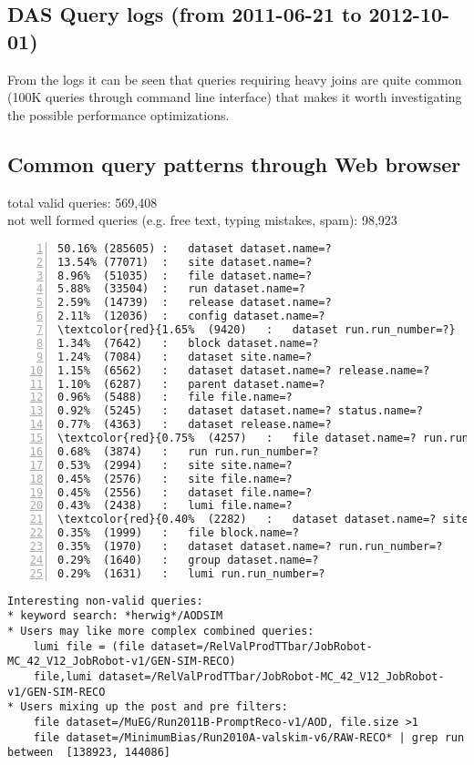 \begin{appendix}
\section{DAS Query logs (from 2011-06-21 to 2012-10-01)}

From the logs it can be seen that queries requiring heavy joins are quite common (100K queries through command line interface) that makes it worth investigating the possible performance optimizations.

\subsection{Common query patterns through Web browser}
total valid queries: 569,408
\\
not well formed queries (e.g. free text, typing mistakes, spam): 98,923

\begin{Verbatim}[commandchars=\\\{\},numbers=left,numbersep=4pt]
50.16% (285605)	:	dataset dataset.name=?
13.54% (77071)	:	site dataset.name=?
8.96%  (51035)	:	file dataset.name=?
5.88%  (33504)	:	run dataset.name=?
2.59%  (14739)	:	release dataset.name=?
2.11%  (12036)	:	config dataset.name=?
\textcolor{red}{1.65%  (9420) 	:	dataset run.run_number=?}
1.34%  (7642) 	:	block dataset.name=?
1.24%  (7084) 	:	dataset site.name=?
1.15%  (6562) 	:	dataset dataset.name=? release.name=?
1.10%  (6287) 	:	parent dataset.name=?
0.96%  (5488) 	:	file file.name=?
0.92%  (5245) 	:	dataset dataset.name=? status.name=?
0.77%  (4363) 	:	dataset release.name=?
\textcolor{red}{0.75%  (4257) 	:	file dataset.name=? run.run_number=?}
0.68%  (3874) 	:	run run.run_number=?
0.53%  (2994) 	:	site site.name=?
0.45%  (2576) 	:	site file.name=?
0.45%  (2556) 	:	dataset file.name=?
0.43%  (2438) 	:	lumi file.name=?
\textcolor{red}{0.40%  (2282) 	:	dataset dataset.name=? site.name=?}
0.35%  (1999) 	:	file block.name=?
0.35%  (1970) 	:	dataset dataset.name=? run.run_number=?
0.29%  (1640) 	:	group dataset.name=?
0.29%  (1631) 	:	lumi run.run_number=?
\end{Verbatim}

{\small
\begin{verbatim}
Interesting non-valid queries:
* keyword search: *herwig*/AODSIM
* Users may like more complex combined queries:
    lumi file = (file dataset=/RelValProdTTbar/JobRobot-MC_42_V12_JobRobot-v1/GEN-SIM-RECO)
    file,lumi dataset=/RelValProdTTbar/JobRobot-MC_42_V12_JobRobot-v1/GEN-SIM-RECO
* Users mixing up the post and pre filters:
    file dataset=/MuEG/Run2011B-PromptReco-v1/AOD, file.size >1
    file dataset=/MinimumBias/Run2010A-valskim-v6/RAW-RECO* | grep run between  [138923, 144086] 
\end{verbatim}
}


\end{appendix}
